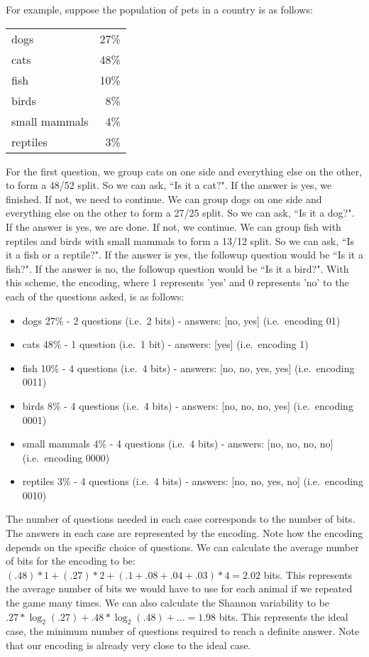 \documentclass[iopart]{revtex4-1}
\begin{document}
For example, suppose the population of pets in a country is as follows:
\begin{table}[h]
\begin{tabular}{lr}
dogs & 27\% \\
cats & 48\% \\
fish & 10\% \\
birds & 8\% \\
small mammals & 4\% \\
reptiles & 3\%
\end{tabular}
\end{table}

\noindent
For the first question, we group cats on one side and everything else on the other, to form a 48/52 split. So we can ask, ``Is it a cat?". If the answer is yes, we finished. If not, we need to continue. We can group dogs on one side and everything else on the other to form a 27/25 split. So we can ask, ``Is it a dog?". If the answer is yes, we are done. If not, we continue. We can group fish with reptiles and birds with small mammals to form a 13/12 split. So we can ask, ``Is it a fish or a reptile?". If the answer is yes, the followup question would be ``Is it a fish?". If the answer is no, the followup question would be ``Is it a bird?". With this scheme, the encoding, where 1 represents 'yes' and 0 represents 'no' to the each of the questions asked, is as follows:
\begin{itemize}
\item dogs 27\% - 2 questions (i.e.~2 bits) - answers: [no, yes] (i.e.~encoding 01)
\item cats 48\% - 1 question (i.e.~1 bit) - answers: [yes] (i.e.~encoding 1)
\item fish 10\% - 4 questions (i.e.~4 bits) - answers: [no, no, yes, yes] (i.e.~encoding 0011)
\item birds 8\% - 4 questions (i.e.~4 bits) - answers: [no, no, no, yes] (i.e.~encoding 0001)
\item small mammals 4\% - 4 questions (i.e.~4 bits) - answers: [no, no, no, no] (i.e.~encoding 0000)
\item reptiles 3\% - 4 questions (i.e.~4 bits) - answers: [no, no, yes, no] (i.e.~encoding 0010)
\end{itemize}
The number of questions needed in each case corresponds to the number of bits. The answers in each case are represented by the encoding. Note how the encoding depends on the specific choice of questions. We can calculate the average number of bits for the encoding to be:  $(.48) * 1 + (.27) * 2 + (.1 + .08 + .04 + .03) * 4 = 2.02$ bits. This represents the average number of bits we would have to use for each animal if we repeated the game many times. We can also calculate the Shannon variability to be $.27 * \log_2(.27) + .48 * \log_2 (.48) + ... =1.98$ bits. This represents the ideal case, the minimum number of questions required to reach a definite answer. Note that our encoding is already very close to the ideal case.
\end{document}
